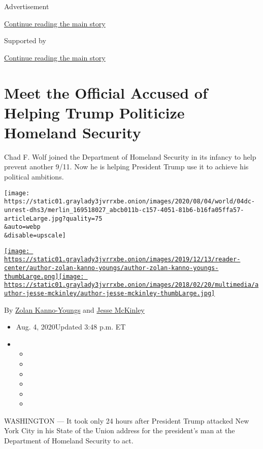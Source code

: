 Advertisement

\protect\hyperlink{after-top}{Continue reading the main story}

Supported by

\protect\hyperlink{after-sponsor}{Continue reading the main story}

\hypertarget{meet-the-official-accused-of-helping-trump-politicize-homeland-security}{%
\section{Meet the Official Accused of Helping Trump Politicize Homeland
Security}\label{meet-the-official-accused-of-helping-trump-politicize-homeland-security}}

Chad F. Wolf joined the Department of Homeland Security in its infancy
to help prevent another 9/11. Now he is helping President Trump use it
to achieve his political ambitions.

\texttt{[image: https://static01.graylady3jvrrxbe.onion/images/2020/08/04/world/04dc-unrest-dhs3/merlin\_169518027\_abcb011b-c157-4051-81b6-b16fa05ffa57-articleLarge.jpg?quality=75\\\&auto=webp\\\&disable=upscale]}

\href{https://www.nytimes3xbfgragh.onion/by/zolan-kanno-youngs}{\texttt{[image: https://static01.graylady3jvrrxbe.onion/images/2019/12/13/reader-center/author-zolan-kanno-youngs/author-zolan-kanno-youngs-thumbLarge.png]}}\href{https://www.nytimes3xbfgragh.onion/by/jesse-mckinley}{\texttt{[image: https://static01.graylady3jvrrxbe.onion/images/2018/02/20/multimedia/author-jesse-mckinley/author-jesse-mckinley-thumbLarge.jpg]}}

By \href{https://www.nytimes3xbfgragh.onion/by/zolan-kanno-youngs}{Zolan
Kanno-Youngs} and
\href{https://www.nytimes3xbfgragh.onion/by/jesse-mckinley}{Jesse
McKinley}

\begin{itemize}
\item
  Aug. 4, 2020Updated 3:48 p.m. ET
\item
  \begin{itemize}
  \item
  \item
  \item
  \item
  \item
  \item
  \end{itemize}
\end{itemize}

WASHINGTON --- It took only 24 hours after President Trump attacked New
York City in his State of the Union address for the president's man at
the Department of Homeland Security to act.

